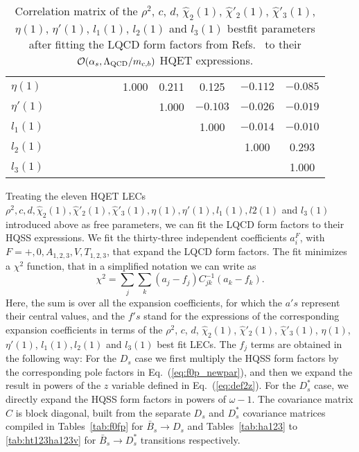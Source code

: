\documentclass[aps,superscriptaddress,showpacs,nofootinbib,11pt]{revtex4-1}
\newcommand{\be}{\begin{equation}} \newcommand{\ee}{\end{equation}}
\begin{document}
\begin{table}[t]
\begin{ruledtabular}
\begin{center}
\begin{tabular}{lccccccccccc}
  $\eta(1)$ & &&&&&&\hspace{0.25cm}1.000 &   \hspace{0.25cm}0.211&  \hspace{0.25cm}0.125& 	 $-0.112$& 	$-0.085$\\
  $\eta'(1)$ & &&&&&&&\hspace{0.25cm}1.000 &   $-0.103$&     $-0.026$ &    $-0.019$\\
  $l_1(1)$ & &&&&&&&& \hspace{0.25cm}1.000 &   $-0.014$& 	 $-0.010$\\
  $l_2(1)$  &&&&&&&&&& \hspace{0.25cm}1.000 &  \hspace{0.25cm}0.293\\
  $l_3(1)$ & &&&&&&&&&&\hspace{0.25cm}1.000\\
\end{tabular}
    \caption{Correlation matrix of the  $\rho^2$, $c$, $d$, $\hat\chi_2(1)$, $\hat\chi'_2(1)$, $\hat\chi'_3(1)$,$\eta(1)$, $\eta'(1)$, $l_1(1)$, $l_2(1)$ and $l_3(1)$ bestfit parameters after fitting the LQCD form factors from Refs.~\cite{McLean:2019qcx,Harrison:2021tol} to their ${\cal O}(\alpha_s,
\Lambda_{\rm QCD}/m_{c,b})$ HQET expressions.}
   \label{tab:hqssfitcovmat}
   \end{center}
   \end{ruledtabular}
\end{table}

Treating the eleven HQET LECs $\rho^2,c,d,\hat\chi_2(1),\hat\chi'_2(1),\hat\chi'_3(1),\eta(1), \eta'(1),l_1(1),l2(1)$ and $l_3(1)$ introduced above as free parameters, we can fit the LQCD form factors to their HQSS expressions. We fit the thirty-three independent coefficients  $a_i^F$, with $F=+,0,{A_{1,2,3}},{V}, {T_{1,2,3}}$, that expand the LQCD form factors. The fit minimizes a $\chi^2$ function, that in a simplified notation we can write as
\be
\chi^2=\sum_{j}\sum_k(a_j-f_j)C^{-1}_{jk}(a_k-f_k).\label{eq:chi2}
\ee
Here, the sum is over all the expansion coefficients, for which the $a's$ represent their central values,
and the $f's$ stand for the expressions of the corresponding expansion coefficients in terms of the
$\rho^2$, $c$, $d$, $\hat\chi_2(1)$, $\hat\chi'_2(1)$, $\hat\chi'_3(1)$,  $\eta(1)$, $\eta'(1)$, $l_1(1), l_2(1)$ and $l_3(1)$ 
best fit LECs.  The $f_j$ terms are obtained in the following way: For the $D_s$ case we first multiply the HQSS form factors by the corresponding pole factors in  Eq.~(\ref{eq:f0p_newpar}), and then we expand the result in powers of the $ z$ variable defined in Eq.~(\ref{eq:def2z}). For the  $D^*_s$ case, we directly expand the  HQSS form factors in powers of $\omega-1$. 
The covariance matrix $C$ is block diagonal, built from the separate $D_s$ and
$D^*_s$ covariance matrices compiled in Tables~\ref{tab:f0fp} for $\bar B_s\to D_s$ and
Tables~\ref{tab:ha123} to \ref{tab:ht123ha123v} for $\bar B_s\to D_s^*$ transitions respectively. 
\end{document}
